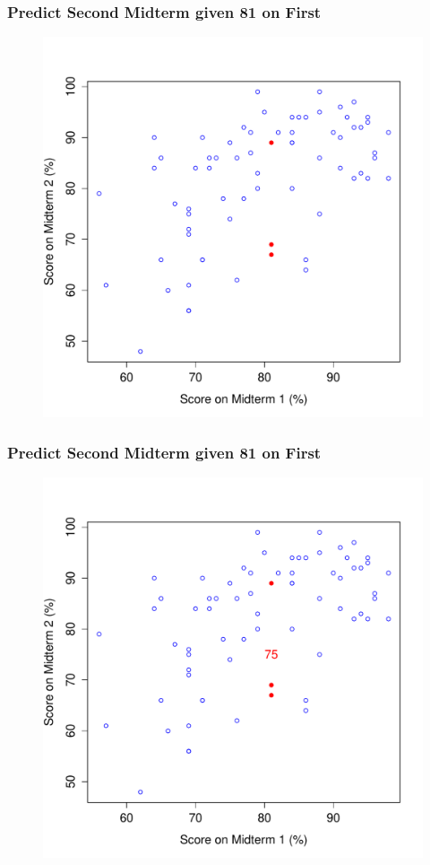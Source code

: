 \documentclass[handout]{beamer}
\begin{document}
\begin{frame}
\frametitle{Predict Second Midterm given 81 on First}
\begin{figure}
	\includegraphics[scale = 0.48]{./images/midterms1}
\end{figure}
\end{frame}
\begin{frame}
\frametitle{Predict Second Midterm given 81 on First}
\begin{figure}
	\includegraphics[scale = 0.48]{./images/midterms2}
\end{figure}
\end{frame}
\end{document}
